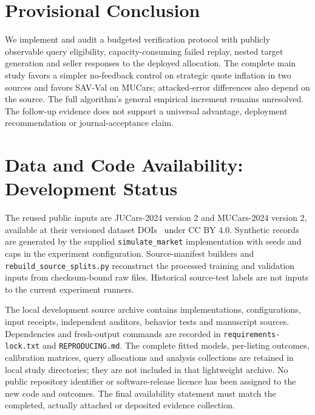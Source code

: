 \documentclass[10pt,journal]{IEEEtran}
\begin{document}
\section{Provisional Conclusion}
We implement and audit a budgeted verification protocol with publicly
observable query eligibility, capacity-consuming failed replay, nested
target generation and seller responses to the deployed allocation.
The complete main study favors a simpler no-feedback control on strategic
quote inflation in two sources and favors SAV-Val on MUCars;
attacked-error differences also depend on the source. The full algorithm's
general empirical increment remains unresolved. The follow-up evidence
does not support a universal advantage, deployment
recommendation or journal-acceptance claim.

\section{Data and Code Availability: Development Status}
The reused public inputs are JUCars-2024 version 2 and MUCars-2024 version 2,
available at their versioned dataset DOIs~\cite{thalji2026jucars,tabarnoust2024mucars}
under CC BY 4.0. Synthetic records are generated by the supplied
\texttt{simulate\_market} implementation with seeds and caps in the experiment
configuration. Source-manifest builders and
\texttt{rebuild\_source\_splits.py} reconstruct the processed training and
validation inputs from checksum-bound raw files. Historical source-test
labels are not inputs to the current experiment runners.

The local development source archive contains implementations, configurations,
input receipts, independent auditors, behavior tests and manuscript sources.
Dependencies and fresh-output commands are recorded in
\texttt{requirements-lock.txt} and \texttt{REPRODUCING.md}. The complete fitted
models, per-listing outcomes, calibration matrices, query allocations and
analysis collections are retained in local study directories; they are not
included in that lightweight archive. No public repository identifier or
software-release licence has been assigned to the new code and outcomes.
The final availability statement must match the completed, actually attached
or deposited evidence collection.
\end{document}
